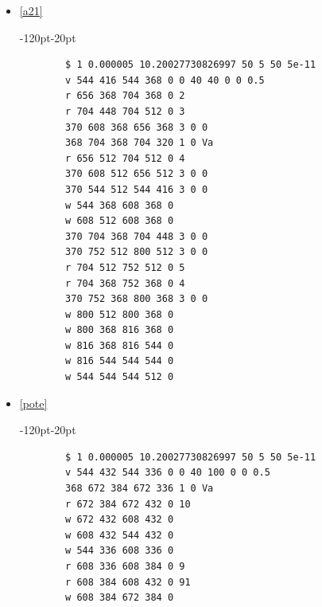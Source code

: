 \documentclass{article}
\begin{document}
\begin{itemize}
\begin{adjustwidth}{-120pt}{-20pt}
	\begin{lstlisting}
		$ 1 0.000005 10.20027730826997 50 5 50 5e-11
		v 672 464 672 416 0 0 40 10 0 0 0.5
		r 720 384 768 384 0 4
		r 768 384 768 448 0 2
		370 672 384 720 384 3 0 0
		368 768 384 768 336 1 0 Va
		r 768 384 816 384 0 2
		370 864 384 816 384 3 0 0
		370 768 448 768 496 3 0 0
		v 864 464 864 416 0 0 40 5 0 0 0.5
		w 672 416 672 384 0
		w 864 416 864 384 0
		w 768 496 672 496 0
		w 672 496 672 464 0
		w 768 496 864 496 0
		w 864 496 864 464 0
	\end{lstlisting}
\end{adjustwidth}
\clearpage
	\item \href{https://www.falstad.com/circuit/circuitjs.html?ctz=CQAgjCAMB0l3BWcMBMcUHYMGZIA4UA2ATmIxAUgoqoQFMBaMMAKADcKAWTkTsQrj2yE8UMZyoSxVGAhYAnEIQQDhojJCEixKBSA09u6zRTAox2Ftg1L8INUpX3t2aVe0HnxoWnBiAagCGesoCCGb6JuHmklY2hHbRjmERrjJxtNym5ghZfKpuAO6CXraiDpAsxQmiSTWlldZUng6eRvZuTfoIORF4cNkd6YqeSRg9g7R6LR4TFbwZ3eYO-VQOaVBVIKuDOxVbe9p4-A0HJysnuTyVxcdhWVclNyWPrxGVQA}{\ref{a21}} \\
\begin{adjustwidth}{-120pt}{-20pt}
	\begin{lstlisting}
		$ 1 0.000005 10.20027730826997 50 5 50 5e-11
		v 544 416 544 368 0 0 40 40 0 0 0.5
		r 656 368 704 368 0 2
		r 704 448 704 512 0 3
		370 608 368 656 368 3 0 0
		368 704 368 704 320 1 0 Va
		r 656 512 704 512 0 4
		370 608 512 656 512 3 0 0
		370 544 512 544 416 3 0 0
		w 544 368 608 368 0
		w 608 512 608 368 0
		370 704 368 704 448 3 0 0
		370 752 512 800 512 3 0 0
		r 704 512 752 512 0 5
		r 704 368 752 368 0 4
		370 752 368 800 368 3 0 0
		w 800 512 800 368 0
		w 800 368 816 368 0
		w 816 368 816 544 0
		w 816 544 544 544 0
		w 544 544 544 512 0
	\end{lstlisting}
\end{adjustwidth}
	\item \href{https://www.falstad.com/circuit/circuitjs.html?ctz=CQAgjCAMB0l3BWcMBMcUHYMGZIA4UA2ATmIxAUgoqoQFMBaMMAKADcKAWTkT7FLj2zZCUMZypg4YqjAQsReEIQwDseHirUjwYgGoBDFgCdlqkOs3m+AyZBYB3MwJvL8vflEdulrhNw9bb38hHUJ3YVF7U3ClSJ8LDTFiEwTLBNcqYlYnWMSrNST7IA}{\ref{pote}} \\
\begin{adjustwidth}{-120pt}{-20pt}
	\begin{lstlisting}
		$ 1 0.000005 10.20027730826997 50 5 50 5e-11
		v 544 432 544 336 0 0 40 100 0 0 0.5
		368 672 384 672 336 1 0 Va
		r 672 384 672 432 0 10
		w 672 432 608 432 0
		w 608 432 544 432 0
		w 544 336 608 336 0
		r 608 336 608 384 0 9
		r 608 384 608 432 0 91
		w 608 384 672 384 0
		
	\end{lstlisting}
\end{adjustwidth}
\end{itemize}
\label{ultimaPagina}
\end{document}
